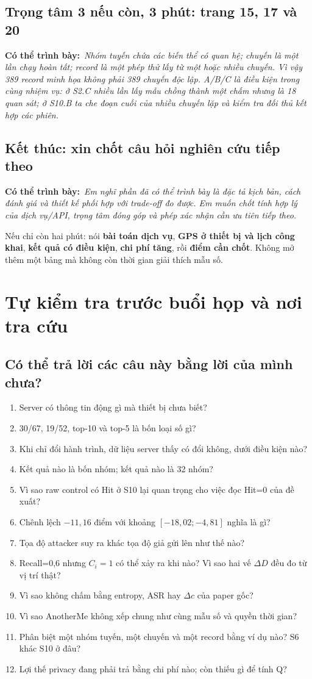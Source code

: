 \documentclass[10pt,a4paper]{article}
\newcommand{\key}[1]{\par\smallskip\noindent\colorbox{pale}{\parbox{\dimexpr\linewidth-2\fboxsep}{#1}}\par\smallskip}
\newcommand{\say}[1]{\par\textbf{Có thể trình bày:}\ \textit{#1}\par}
\newcommand{\guidepage}[1]{\clearpage\section{#1}}
\begin{document}
\subsection*{Trọng tâm 3 nếu còn, 3 phút: trang 15, 17 và 20}
\say{Nhóm tuyến chứa các biến thể có quan hệ; chuyến là một lần chạy hoàn tất; record là một phép thử lấy từ một hoặc nhiều chuyến. Vì vậy 389 record minh họa không phải 389 chuyến độc lập. A/B/C là điều kiện trong cùng nhiệm vụ: ở S2.C nhiều lần lấy mẫu chồng thành một chấm nhưng là 18 quan sát; ở S10.B ta che đoạn cuối của nhiều chuyến lặp và kiểm tra đối thủ kết hợp các phiên.}

\subsection*{Kết thúc: xin chốt câu hỏi nghiên cứu tiếp theo}
\say{Em nghĩ phần đã có thể trình bày là đặc tả kịch bản, cách đánh giá và thiết kế phối hợp với trade-off đo được. Em muốn chốt tính hợp lý của dịch vụ/API, trọng tâm đóng góp và phép xác nhận cần ưu tiên tiếp theo.}

\key{Nếu chỉ còn hai phút: nói \textbf{bài toán dịch vụ}, \textbf{GPS ở thiết bị và lịch công khai}, \textbf{kết quả có điều kiện}, \textbf{chi phí tăng}, rồi \textbf{điểm cần chốt}. Không mở thêm một bảng mà không còn thời gian giải thích mẫu số.}

\guidepage{Tự kiểm tra trước buổi họp và nơi tra cứu}
\subsection*{Có thể trả lời các câu này bằng lời của mình chưa?}
\begin{enumerate}
\item Server có thông tin động gì mà thiết bị chưa biết?
\item 30/67, 19/52, top-10 và top-5 là bốn loại số gì?
\item Khi chỉ đổi hành trình, dữ liệu server thấy có đổi không, dưới điều kiện nào?
\item Kết quả nào là bốn nhóm; kết quả nào là 32 nhóm?
\item Vì sao raw control có Hit ở S10 lại quan trọng cho việc đọc Hit=0 của đề xuất?
\item Chênh lệch $-11{,}16$ điểm với khoảng $[-18{,}02;-4{,}81]$ nghĩa là gì?
\item Tọa độ attacker suy ra khác tọa độ giả gửi lên như thế nào?
\item Recall=0,6 nhưng $C_i=1$ có thể xảy ra khi nào? Vì sao hai vế $\Delta D$ đều đo từ vị trí thật?
\item Vì sao không chấm bằng entropy, ASR hay $\Delta c$ của paper gốc?
\item Vì sao AnotherMe không xếp chung như cùng mẫu số và quyền thời gian?
\item Phân biệt một nhóm tuyến, một chuyến và một record bằng ví dụ nào? S6 khác S10 ở đâu?
\item Lợi thế privacy đang phải trả bằng chi phí nào; còn thiếu gì để tính Q?
\end{enumerate}
\end{document}

